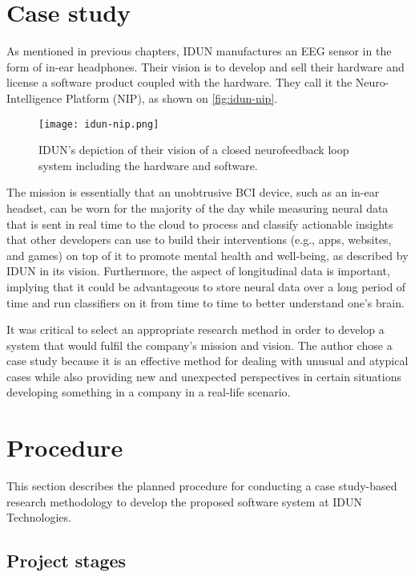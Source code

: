 \section{Case study}
\label{chapter3-case-study}

As mentioned in previous chapters, IDUN manufactures an EEG sensor in the form of in-ear headphones. Their vision is to develop and sell their hardware and license a software product coupled with the hardware. They call it the Neuro-Intelligence Platform (NIP), as shown on \autoref{fig:idun-nip}.

\begin{figure}[!ht]
  \centering
  \texttt{[image: idun-nip.png]}
  \caption{IDUN's depiction of their vision of a closed neurofeedback loop system including the hardware and software.}
  \label{fig:idun-nip}
\end{figure}

The mission is essentially that an unobtrusive BCI device, such as an in-ear headset, can be worn for the majority of the day while measuring neural data that is sent in real time to the cloud to process and classify actionable insights that other developers can use to build their interventions (e.g., apps, websites, and games) on top of it to promote mental health and well-being, as described by IDUN in its vision. Furthermore, the aspect of longitudinal data is important, implying that it could be advantageous to store neural data over a long period of time and run classifiers on it from time to time to better understand one's brain.

It was critical to select an appropriate research method in order to develop a system that would fulfil the company's mission and vision. The author chose a case study because it is an effective method for dealing with unusual and atypical cases while also providing new and unexpected perspectives in certain situations developing something in a company in a real-life scenario.

\section{Procedure}
\label{chapter3-procedure}

This section describes the planned procedure for conducting a case study-based research methodology to develop the proposed software system at IDUN Technologies.

\subsection{Project stages}
\label{chapter3-project-stages}

